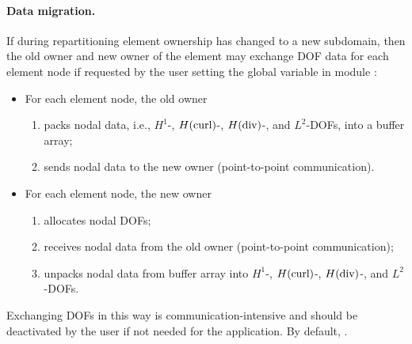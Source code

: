 \paragraph{Data migration.} If during repartitioning element ownership has changed to a new subdomain, then the old owner and new owner of the element may exchange DOF data for each element node if requested by the user setting the global variable  in module :
\begin{itemize}
	\itemsep -2pt
	\item For each element node, the old owner
	\begin{enumerate}
		\itemsep -2pt
		\item packs nodal data, i.e., $H^1$-, $H(\text{curl})$-, $H(\text{div})$-, and $L^2$-DOFs, into a buffer array;
		\item sends nodal data to the new owner (point-to-point communication).
	\end{enumerate}
	\item For each element node, the new owner
	\begin{enumerate}
		\itemsep -2pt
		\item allocates nodal DOFs;
		\item receives nodal data from the old owner (point-to-point communication);
		\item unpacks nodal data from buffer array into $H^1$-, $H(\text{curl})$-, $H(\text{div})$-, and $L^2$-DOFs.
	\end{enumerate}
\end{itemize}

Exchanging DOFs in this way is communication-intensive and should be deactivated by the user if not needed for the application. By default, .


%



